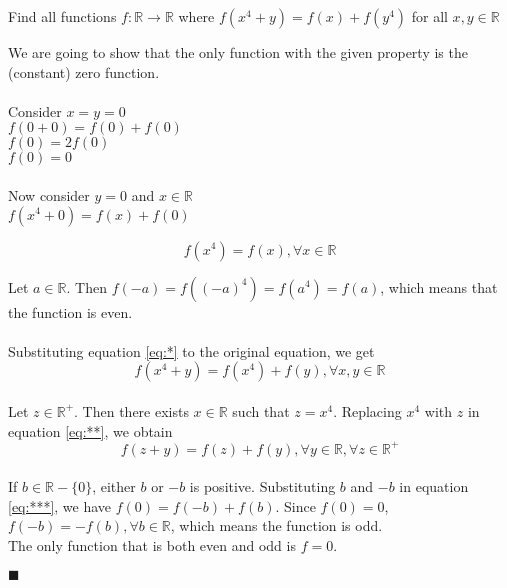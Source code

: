 \documentclass[12pt]{article}
\newcommand{\R}{\mathbb{R}}
\renewcommand{\qed}{\hfill$\blacksquare$}
\renewenvironment{proof}{\begin{addmargin}[1em]{0em}\begin{newproof}}{\end{newproof}\end{addmargin}\qed}
\newenvironment{problem}[2][Problem]{\begin{trivlist}
\item[\hskip \labelsep {\bfseries #1}\hskip \labelsep {\bfseries #2.}]}{\end{trivlist}}
\begin{document}
 

\rhead{\today}
 

\begin{problem}{882}
Find all functions $f: \R\xrightarrow{}\R  $ where $f(x^4+y) = f(x) + f(y^4)$ for all $x,y \in \R$
\end{problem}

 
\begin{proof}{We are going to show that the only function with the given property is the (constant) zero function.}\\
\\
Consider $x = y = 0$ \\
$f(0 + 0) = f(0) + f(0)$ \\
$f(0) = 2f(0)$ \\
$f(0) = 0$ \\
\\
Now consider $y = 0$ and $x \in \R$ \\
$f(x^4 + 0)=f(x)+f(0)$ 

\begin{equation} \label{eq:*}
f(x^4)=f(x), \forall x \in \R
\end{equation}

Let $a \in \R$. Then $f(-a) = f((-a)^4) = f(a^4) = f(a)$, which means that the function is even.\\
\\
Substituting equation \ref{eq:*} to the original equation, we get 
\begin{equation} \label{eq:**}
f(x^4+y) = f(x^4)+f(y),  \forall x,y \in \R
\end{equation}
\\
Let $z \in \R^+$. Then there exists $x \in \R$ such that $z=x^4$. Replacing $x^4$ with $z$ in equation \ref{eq:**}, we obtain 
\begin{equation} \label{eq:***}
f(z+y)=f(z)+f(y), \forall y \in \R, \forall z \in \R^+
\end{equation}
\\
If $b \in \R - \{0\}$, either $b$ or $-b$ is positive. Substituting $b$ and $-b$ in equation \ref{eq:***}, we have $f(0) = f(-b) + f(b)$. Since $f(0) = 0$, $f(-b) = -f(b), \forall b \in \R$, which means the function is odd.
\\
The only function that is both even and odd is $f=0$.
\end{proof}

 
\end{document}
